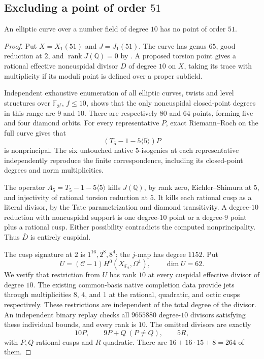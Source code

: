 \subsection{Excluding a point of order $51$}
\begin{proposition}\label{prop:decic-no51}
An elliptic curve over a number field of degree $10$ has no point of order $51$.
\end{proposition}
\begin{proof}
Put $X=X_1(51)$ and $J=J_1(51)$. The curve has genus $65$, good
reduction at $2$, and $\operatorname{rank}J(\mathbb Q)=0$ by
\cite[Theorem~3.1(2)]{DEHMZ}.
A proposed torsion point gives a rational effective noncuspidal
divisor $D$ of degree $10$ on $X$, taking its trace with
multiplicity if its moduli point is defined over a proper subfield.

Independent exhaustive enumeration of all elliptic curves,
twists and level structures over $\mathbb F_{2^f}$, $f\leq10$,
shows that the only noncuspidal closed-point degrees in this
range are $9$ and $10$. There are respectively $80$ and $64$
points, forming five and four diamond orbits.
For every representative $P$, exact Riemann--Roch on the full
curve gives that
\[
 (T_5-1-5\langle5\rangle)P
\]
is nonprincipal. The six untouched native $5$-isogenies at
each representative independently reproduce the finite
correspondence, including its closed-point degrees and norm
multiplicities.

The operator $A_5=T_5-1-5\langle5\rangle$ kills $J(\mathbb Q)$,
by rank zero, Eichler--Shimura at $5$, and injectivity of rational
torsion reduction at $5$. It kills each rational cusp as a
literal divisor, by the Tate parametrization and diamond
transitivity. A degree-$10$ reduction with noncuspidal support
is one degree-$10$ point or a degree-$9$ point plus a rational
cusp. Either possibility contradicts the computed
nonprincipality. Thus $\overline D$ is entirely cuspidal.

The cusp signature at $2$ is $1^{16},2^8,8^4$; the $j$-map has
degree $1152$. Put
\[
 U=(\mathcal C-1)H^0(X_{\mathbb F_2},\Omega^1),\qquad\dim U=62.
\]
We verify that restriction from $U$ has rank $10$ at every
cuspidal effective divisor of degree $10$.
The existing common-basis native completion data provide jets
through multiplicities $8$, $4$, and $1$ at the rational,
quadratic, and octic cusps respectively. These restrictions are
independent of the total degree of the divisor.
An independent binary replay checks all $9655880$ degree-$10$
divisors satisfying these individual bounds, and every rank is $10$.
The omitted divisors are exactly
\[
 10P,\qquad9P+Q\ (P\ne Q),\qquad5R,
\]
with $P,Q$ rational cusps and $R$ quadratic. There are
$16+16\cdot15+8=264$ of them.


\end{proof}
